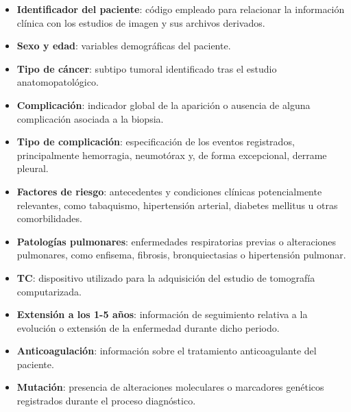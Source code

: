 \begin{itemize}[itemsep=2pt, topsep=4pt]
    \item \textbf{Identificador del paciente}: código empleado para relacionar la información clínica con los estudios de imagen y sus archivos derivados.

    \item \textbf{Sexo y edad}: variables demográficas del paciente.

    \item \textbf{Tipo de cáncer}: subtipo tumoral identificado tras el estudio anatomopatológico.

    \item \textbf{Complicación}: indicador global de la aparición o ausencia de alguna complicación asociada a la biopsia.

    \item \textbf{Tipo de complicación}: especificación de los eventos registrados, principalmente hemorragia, neumotórax y, de forma excepcional, derrame pleural.

    \item \textbf{Factores de riesgo}: antecedentes y condiciones clínicas potencialmente relevantes, como tabaquismo, hipertensión arterial, diabetes mellitus u otras comorbilidades.

    \item \textbf{Patologías pulmonares}: enfermedades respiratorias previas o alteraciones pulmonares, como enfisema, fibrosis, bronquiectasias o hipertensión pulmonar.

    \item \textbf{TC}: dispositivo utilizado para la adquisición del estudio de tomografía computarizada.

    \item \textbf{Extensión a los 1-5 años}: información de seguimiento relativa a la evolución o extensión de la enfermedad durante dicho periodo.

    \item \textbf{Anticoagulación}: información sobre el tratamiento anticoagulante del paciente.

    \item \textbf{Mutación}: presencia de alteraciones moleculares o marcadores genéticos registrados durante el proceso diagnóstico.
\end{itemize}


